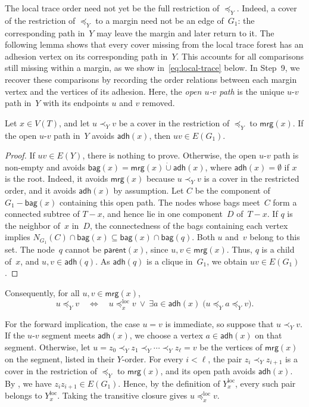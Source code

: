 \documentclass[1p,number,11pt]{elsarticle}
\theoremstyle{plain}
\newcommand{\bag}{\mathsf{bag}}
\newcommand{\mrg}{\mathsf{mrg}}
\newcommand{\adh}{\mathsf{adh}}
\newcommand{\parent}{\mathsf{parent}}
\begin{document}
The local trace order need not yet be the full restriction of
$\preceq_Y$. Indeed, a cover of the restriction of $\preceq_Y$ to a
margin need not be an edge of~$G_1$: the corresponding path in~$Y$
may leave the margin and later return to it. The following lemma
shows that every cover missing from the local trace forest has
an adhesion vertex on its corresponding path in~$Y$. This accounts
for all comparisons still missing within a margin, as we show
in~\eqref{eq:local-trace} below. In Step~9, we recover these
comparisons by recording the order relations between each margin
vertex and the vertices of its adhesion.
Here, the \emph{open $u$-$v$ path} is the unique $u$-$v$ path
in~$Y$ with its endpoints $u$ and $v$ removed.

\begin{lemma}\label{lem:local-trace}
Let $x\in V(T)$, and let $u\prec_Y v$ be a cover in the restriction of
$\preceq_Y$ to $\mrg(x)$. If the open $u$-$v$ path in~$Y$ avoids
$\adh(x)$, then $uv\in E(G_1)$.
\end{lemma}

\begin{proof}
If $uv\in E(Y)$, there is nothing to prove.
Otherwise, the open $u$-$v$ path is non-empty and avoids $\bag(x)=\mrg(x)\mathbin{\dot\cup}\adh(x)$, where $\adh(x)=\emptyset$ if $x$ is the root.
Indeed, it avoids $\mrg(x)$ because $u\prec_Yv$ is a cover in the restricted order, and it avoids $\adh(x)$ by assumption.
Let $C$ be the component of $G_1-\bag(x)$ containing this open path.
The nodes whose bags meet~$C$ form a connected subtree of $T-x$, and hence lie in one component~$D$ of~$T-x$.
If $q$ is the neighbor of~$x$ in~$D$, the connectedness of the bags containing each vertex implies $N_{G_1}(C)\cap\bag(x)\subseteq\bag(x)\cap\bag(q)$.
Both $u$ and~$v$ belong to this set.
The node~$q$ cannot be $\parent(x)$, since $u,v\in\mrg(x)$.
Thus, $q$ is a child of~$x$, and $u,v\in\adh(q)$.
As $\adh(q)$ is a clique in~$G_1$, we obtain $uv\in E(G_1)$.
\end{proof}

Consequently, for all $u,v\in\mrg(x)$,
\begin{equation}\tag{$\ast$}\label{eq:local-trace}
u\preceq_Y v
\quad\Longleftrightarrow\quad
u\preceq_x^{\mathrm{loc}}v
\ \lor\
\exists a\in\adh(x)\;
\bigl(u\preceq_Y a\preceq_Y v\bigr).
\end{equation}

For the forward implication, the case $u=v$ is immediate, so suppose
that $u\prec_Y v$. If the $u$-$v$ segment meets $\adh(x)$, we choose a
vertex $a\in\adh(x)$ on that segment. Otherwise, let
$u=z_0\prec_Y z_1\prec_Y\cdots\prec_Y z_\ell=v$ be the vertices of
$\mrg(x)$ on the segment, listed in their $Y$-order. For every
$i<\ell$, the pair $z_i\prec_Y z_{i+1}$ is a cover in the restriction
of $\preceq_Y$ to $\mrg(x)$, and its open path avoids $\adh(x)$. By
\zcref{lem:local-trace}, we have $z_iz_{i+1}\in E(G_1)$. Hence, by the
definition of $Y_x^{\mathrm{loc}}$, every such pair belongs to
$Y_x^{\mathrm{loc}}$. Taking the transitive closure gives
$u\preceq_x^{\mathrm{loc}}v$.
\end{document}
